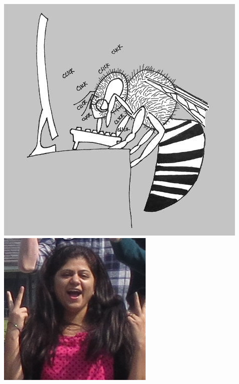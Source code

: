 \documentclass{beamer}
\begin{document}
\begin{frame}
\begin{columns}
\begin{columns}
\includegraphics[width=\textwidth]{Valentin.jpg}
\includegraphics[width=\textwidth]{Rashi.jpg}

\end{columns}
\end{columns}
\end{frame}
\end{document}
